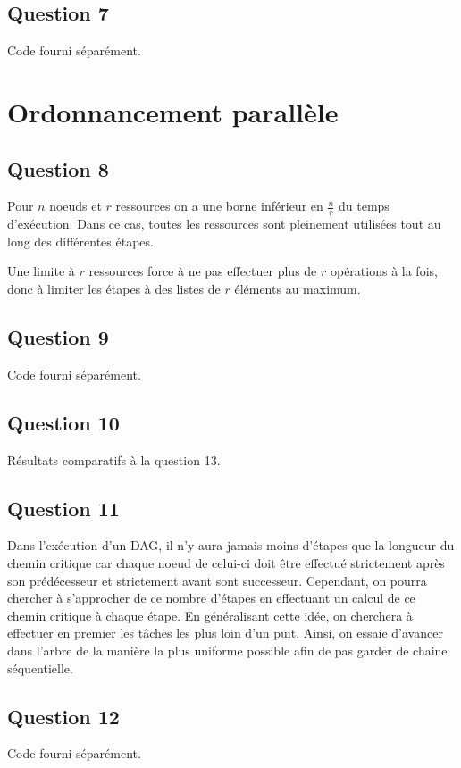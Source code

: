 \documentclass[11pt]{article}
\begin{document}
  \subsection{Question 7}
    Code fourni séparément.

\section{Ordonnancement parallèle}
  \subsection{Question 8}
    Pour $n$ noeuds et $r$ ressources on a une borne inférieur en $\frac{n}{r}$
    du temps d'exécution. Dans ce cas, toutes les ressources sont pleinement
    utilisées tout au long des différentes étapes.

    Une limite à $r$ ressources force à ne pas effectuer plus de $r$ opérations
    à la fois, donc à limiter les étapes à des listes de $r$ éléments au
    maximum.

  \subsection{Question 9}
    Code fourni séparément.

  \subsection{Question 10}
    Résultats comparatifs à la question 13.

  \subsection{Question 11}
    Dans l'exécution d'un DAG, il n'y aura jamais moins d'étapes que la longueur
    du chemin critique car chaque noeud de celui-ci doit être effectué
    strictement après son prédécesseur et strictement avant sont successeur.
    Cependant, on pourra chercher à s'approcher de ce nombre d'étapes en
    effectuant un calcul de ce chemin critique à chaque étape.  En généralisant
    cette idée, on cherchera à effectuer en premier les tâches les plus loin
    d'un puit. Ainsi, on essaie d'avancer dans l'arbre de la manière la plus
    uniforme possible afin de pas garder de chaine séquentielle.

  \subsection{Question 12}
    Code fourni séparément.
\end{document}

